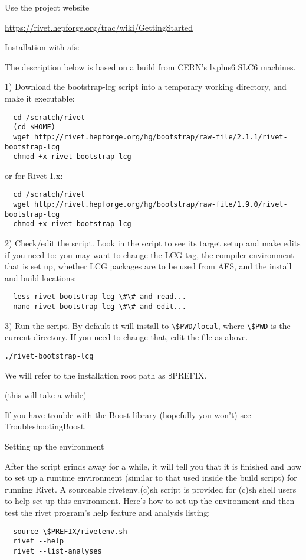 Use the project website

\url{https://rivet.hepforge.org/trac/wiki/GettingStarted}

Installation with afs:

The description below is based on a build from CERN's lxplus6 SLC6 machines.

1) Download the bootstrap-lcg script into a temporary working directory, and make it executable:
\begin{lstlisting}
  cd /scratch/rivet
  (cd $HOME)
  wget http://rivet.hepforge.org/hg/bootstrap/raw-file/2.1.1/rivet-bootstrap-lcg
  chmod +x rivet-bootstrap-lcg
\end{lstlisting}
  
  
or for Rivet 1.x:
\begin{lstlisting}
  cd /scratch/rivet
  wget http://rivet.hepforge.org/hg/bootstrap/raw-file/1.9.0/rivet-bootstrap-lcg
  chmod +x rivet-bootstrap-lcg
\end{lstlisting}


2) Check/edit the script. Look in the script to see its target setup and make edits if you need to: you may want to change the LCG tag, the compiler environment that is set up, whether LCG packages are to be used from AFS, and the install and build locations:
\begin{lstlisting}
  less rivet-bootstrap-lcg \#\# and read...
  nano rivet-bootstrap-lcg \#\# and edit...
\end{lstlisting}


3) Run the script. By default it will install to \lstinline|\$PWD/local|, where \lstinline|\$PWD| is the current directory. If you need to change that, edit the file as above.

\lstinline|./rivet-bootstrap-lcg|

We will refer to the installation root path as \$PREFIX.

(this will take a while)

If you have trouble with the Boost library (hopefully you won't) see TroubleshootingBoost.

Setting up the environment

After the script grinds away for a while, it will tell you that it is finished and how to set up a runtime environment (similar to that used inside the build script) for running Rivet. A sourceable rivetenv.(c)sh script is provided for (c)sh shell users to help set up this environment. Here's how to set up the environment and then test the rivet program's help feature and analysis listing:
\begin{lstlisting}
  source \$PREFIX/rivetenv.sh
  rivet --help
  rivet --list-analyses
\end{lstlisting}

